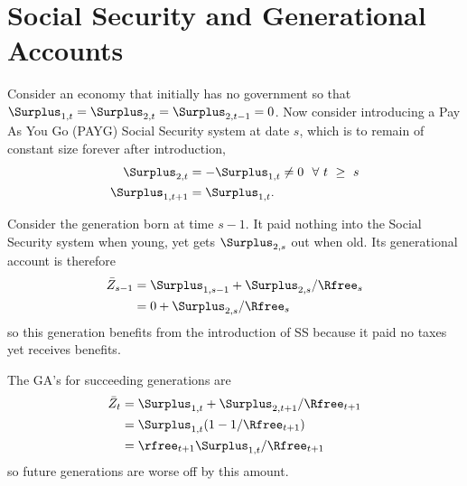 \documentclass{handout}
\begin{document}
\section{Social Security and Generational Accounts}

Consider an economy that initially has no government so that 
$\Surplus_{1,t}=\Surplus_{2,t}=\Surplus_{2,t-1} = 0$.  Now consider introducing a Pay As 
You Go (PAYG) Social Security system at date $s$, which is to remain 
of constant size forever after introduction,
\begin{equation}\begin{gathered}\begin{aligned}
        \Surplus_{2,t} & =   -\Surplus_{1,t} \neq 0~~ \forall~t~\geq~s
\\      \Surplus_{1,t+1} & =  \Surplus_{1,t}.
\end{aligned}\end{gathered}\end{equation}

Consider the generation born at time $s-1$.  It paid nothing into the 
Social Security system when young, yet gets $\Surplus_{2,s}$ out when old.
Its generational account is therefore 
\begin{equation}\begin{gathered}\begin{aligned}
        \bar{Z}_{s-1} & =  \Surplus_{1,s-1}+\Surplus_{2,s}/\Rfree_{s}  \\
         & =  0+\Surplus_{2,s}/\Rfree_{s}
\end{aligned}\end{gathered}\end{equation}
so this generation benefits from the introduction of SS because 
it paid no taxes yet receives benefits.

The GA's for succeeding generations are
\begin{equation}\begin{gathered}\begin{aligned}
        \bar{Z}_{t} & =  \Surplus_{1,t}+\Surplus_{2,t+1}/\Rfree_{t+1}  \\
         & =  \Surplus_{1,t}(1-1/\Rfree_{t+1})  \\
         & =  \rfree_{t+1}\Surplus_{1,t}/\Rfree_{t+1} \label{eq:SScost}
\end{aligned}\end{gathered}\end{equation}
so future generations are worse off by this amount.  
\end{document}
